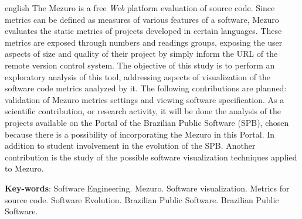 \begin{resumo}[Abstract]
 \begin{otherlanguage*}{english}
   The Mezuro is a free \textit{Web} platform evaluation of source code. Since
   metrics can be defined as measures of various features of a software, Mezuro
   evaluates the static metrics of projects developed in certain languages.
   These metrics are exposed through numbers and readings groups, exposing the
   user aspects of size and quality of their project by simply inform the URL of
   the remote version control system. The objective of this study is to perform
   an exploratory analysis of this tool, addressing aspects of visualization of
   the software code metrics analyzed by it. The following contributions are
   planned:  validation of Mezuro metrics settings and viewing software
   specification. As a scientific contribution, or research activity, it will
   be done the analysis of the projects available on the Portal of the Brazilian
   Public Software (SPB), chosen because there is a possibility of incorporating
   the Mezuro in this Portal. In addition to student involvement in the
   evolution of the SPB. Another contribution is the study of the possible
   software visualization techniques applied to Mezuro.

   \vspace{\onelineskip}

   \noindent
   \textbf{Key-words}: Software Engineering. Mezuro. Software visualization.
   Metrics for source code. Software Evolution. Brazilian Public Software.
   Brazilian Public Software.
 \end{otherlanguage*}
\end{resumo}
